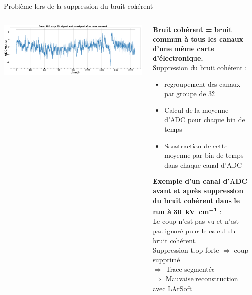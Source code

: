 \begin{frame}{Problème lors de la suppression du bruit cohérent}
\begin{scriptsize}
\begin{columns}
\begin{column}{0.45\textwidth}
                    \centering \includegraphics[width=\textwidth]{./pictures/cnsub_adcs_high_threshold.pdf}\\
                 \end{column}
                \begin{column}{0.55\textwidth}
                    \textbf{Bruit cohérent = bruit commun à tous les canaux d'une même carte d'électronique.} \\\vspace{0.3cm}
                    Suppression du bruit cohérent :
                    \begin{itemize}
                        \item regroupement des canaux par groupe de 32
                        \item Calcul de la moyenne d'ADC pour chaque bin de temps
                        \item Soustraction de cette moyenne par bin de temps dans chaque canal d'ADC
                    \end{itemize} 
                    \vspace{0.3cm}
                    \textbf{ Exemple d'un canal d'ADC avant et après suppression du bruit cohérent dans le run à \SI{30}{\kilo\volt\per\centi\meter} }: \\Le coup n'est pas vu et n'est pas ignoré pour le calcul du bruit cohérent. \\
                     Suppression trop forte $\Rightarrow$ coup supprimé \\
                    $\Rightarrow$ Trace segmentée \\
                    $\Rightarrow$ Mauvaise reconstruction avec LArSoft \\
                \end{column}
            \end{columns}
        \end{scriptsize}
    \end{frame}

